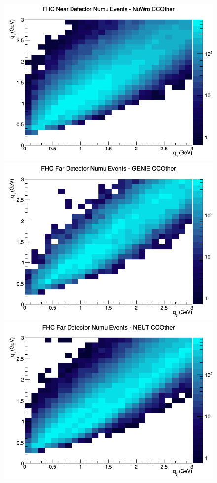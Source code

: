 \documentclass[12pt]{article}
\begin{document}
\begin{figure}[h]
\includegraphics[width=\linewidth]{eff_q0_q3/FGT/CCOther_FHC_ND_numu_q3_q0_NuWro.png}
\endminipage
\newline
{}
\includegraphics[width=\linewidth]{eff_q0_q3/FGT/CCOther_FHC_FD_numu_q3_q0_GENIE.png}
\endminipage
{}
\includegraphics[width=\linewidth]{eff_q0_q3/FGT/CCOther_FHC_FD_numu_q3_q0_NEUT.png}

\end{figure}
\end{document}
